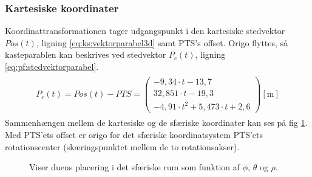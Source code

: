 \subsubsection{Kartesiske koordinater}
Koordinattransformationen tager udgangspunkt i den kartesiske stedvektor \(Pos\left(t\right) \), ligning \ref{eq:ks:vektorparabel3d} samt PTS's offset.
Origo flyttes, så kasteparablen kan beskrives ved stedvektor \(P_c\left(t\right)\), ligning \ref{eq:pf:stedvektorparabel}.
\begin{align}
\begin{split}
{ P }_{ c }\left(t\right)=Pos\left( t \right) -PTS = \left( \begin{matrix} - 9,34\cdot t-13,7 \\32,851\cdot t-19,3
\\-{ 4,91\cdot t }^{ 2 }+5,473\cdot t+2,6\end{matrix} \right) [\text{m}]
\label{eq:pf:stedvektorparabel}
\end{split}
\end{align}
Sammenhængen mellem de kartesiske og de sfæriske koordinater kan ses på fig \ref{fig:thetaphi_degree}. 
Med PTS'ets offset er origo for det sfæriske koordinatsystem PTS'ets rotationscenter (skæringspunktet mellem de to rotationsakser).

\begin{figure}[!th]
\centering
\begin{tikzpicture}[scale=4]

\end{tikzpicture}
\caption[Sfærisk koordinatsystem til koordinattransformation]{Viser duens placering i det sfæriske rum som funktion af  \(\phi\), \(\theta\) og \(\rho\).}
\label{fig:thetaphi_degree}
\end{figure}

